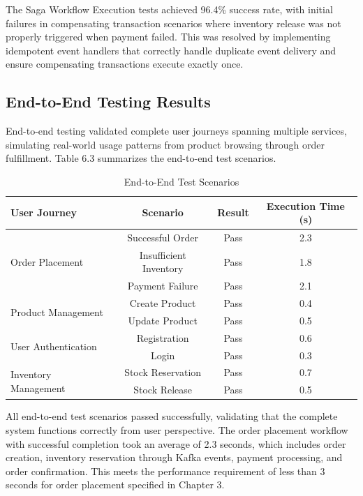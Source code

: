 The Saga Workflow Execution tests achieved 96.4\% success rate, with initial failures in compensating transaction scenarios where inventory release was not properly triggered when payment failed. This was resolved by implementing idempotent event handlers that correctly handle duplicate event delivery and ensure compensating transactions execute exactly once.

\subsection{End-to-End Testing Results}

End-to-end testing validated complete user journeys spanning multiple services, simulating real-world usage patterns from product browsing through order fulfillment. Table 6.3 summarizes the end-to-end test scenarios.

\begin{table}[h]
\centering
\caption{End-to-End Test Scenarios}
\begin{tabular}{|l|c|c|c|}
\hline
\textbf{User Journey} & \textbf{Scenario} & \textbf{Result} & \textbf{Execution Time (s)} \\
\hline
\multirow{3}{*}{Order Placement} & Successful Order & Pass & 2.3 \\
& Insufficient Inventory & Pass & 1.8 \\
& Payment Failure & Pass & 2.1 \\
\hline
\multirow{2}{*}{Product Management} & Create Product & Pass & 0.4 \\
& Update Product & Pass & 0.5 \\
\hline
\multirow{2}{*}{User Authentication} & Registration & Pass & 0.6 \\
& Login & Pass & 0.3 \\
\hline
\multirow{2}{*}{Inventory Management} & Stock Reservation & Pass & 0.7 \\
& Stock Release & Pass & 0.5 \\
\hline
\end{tabular}
\end{table}

All end-to-end test scenarios passed successfully, validating that the complete system functions correctly from user perspective. The order placement workflow with successful completion took an average of 2.3 seconds, which includes order creation, inventory reservation through Kafka events, payment processing, and order confirmation. This meets the performance requirement of less than 3 seconds for order placement specified in Chapter 3.

